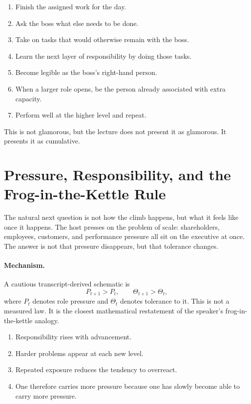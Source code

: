 \begin{enumerate}
\item Finish the assigned work for the day.
\item Ask the boss what else needs to be done.
\item Take on tasks that would otherwise remain with the boss.
\item Learn the next layer of responsibility by doing those tasks.
\item Become legible as the boss's right-hand person.
\item When a larger role opens, be the person already associated with extra capacity.
\item Perform well at the higher level and repeat.
\end{enumerate}

This is not glamorous, but the lecture does not present it as glamorous. It presents it as cumulative.

\section{Pressure, Responsibility, and the Frog-in-the-Kettle Rule}

The natural next question is not how the climb happens, but what it feels like once it happens. The host presses on the problem of scale: shareholders, employees, customers, and performance pressure all sit on the executive at once. The answer is not that pressure disappears, but that tolerance changes.

\paragraph{Mechanism.} A cautious transcript-derived schematic is
\begin{equation}
P_{t+1}>P_t,\qquad \Theta_{t+1}>\Theta_t,
\end{equation}
where \(P_t\) denotes role pressure and \(\Theta_t\) denotes tolerance to it. This is not a measured law. It is the closest mathematical restatement of the speaker's frog-in-the-kettle analogy.

\begin{enumerate}
\item Responsibility rises with advancement.
\item Harder problems appear at each new level.
\item Repeated exposure reduces the tendency to overreact.
\item One therefore carries more pressure because one has slowly become able to carry more pressure.
\end{enumerate}

